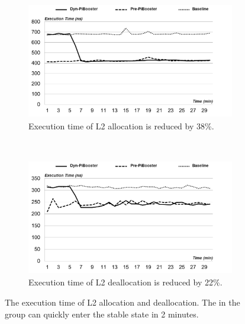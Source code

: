 \begin{figure}[t!]
    \centering
    \begin{subfigure}[t]{0.5\textwidth}
        \centering
        \includegraphics[height=2.0in]{image/micro/PMDalloc.png}
        \caption{Execution time of L2 allocation is reduced by 38\%.}
        \label{fig:l2a}
    \end{subfigure}%
    ~
    \begin{subfigure}[t]{0.5\textwidth}
        \centering
        \includegraphics[height=2.0in]{image/micro/PMDfree.png}
        \caption{Execution time of L2 deallocation is reduced by 22\%.}
        \label{fig:l2b}
    \end{subfigure}
    \caption{The execution time of L2 allocation and deallocation. The \name in the \dynname group can quickly enter the stable state in 2 minutes.}
    \label{fig:PMDtime}
\end{figure}

